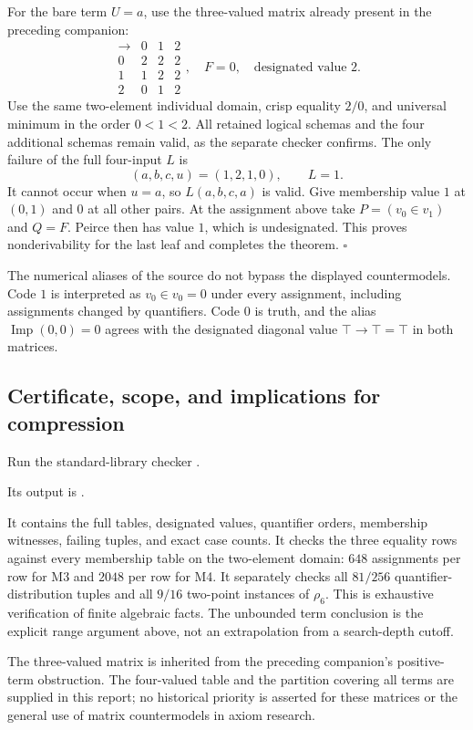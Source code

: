For the bare term $U=a$, use the three-valued matrix already present
in the preceding companion:
\[
\begin{array}{c|ccc}
 \to&0&1&2\\\hline
 0&2&2&2\\
 1&1&2&2\\
 2&0&1&2
\end{array},
\quad F=0,\quad\text{designated value }2.
\tag{M3}\label{eq:fourth-m3}
\]
Use the same two-element individual domain, crisp equality $2/0$,
and universal minimum in the order $0<1<2$.  All retained logical
schemas and the four additional schemas remain valid, as the separate
checker confirms.  The only failure of the full four-input $L$ is
\[
 (a,b,c,u)=(1,2,1,0),\qquad L=1.
\]
It cannot occur when $u=a$, so $L(a,b,c,a)$ is valid.
Give membership value $1$ at $(0,1)$ and $0$ at all other pairs.
At the assignment above take $P=(v_0\in v_1)$ and $Q=F$.
Peirce then has value $1$, which is undesignated.  This proves
nonderivability for the last leaf and completes the theorem.
\hfill$\square$

The numerical aliases of the source do not bypass the displayed
countermodels.  Code $1$ is interpreted as $v_0\in v_0=0$ under every
assignment, including assignments changed by quantifiers.  Code $0$
is truth, and the alias $\operatorname{Imp}(0,0)=0$ agrees with the
designated diagonal value $\top\to\top=\top$ in both matrices.

\subsection{Certificate, scope, and implications for compression}

Run the standard-library checker .

Its output is .

It contains the full tables, designated values, quantifier orders,
membership witnesses, failing tuples, and exact case counts.  It checks
the three equality rows against every membership table on the
two-element domain: $648$ assignments per row for M3 and $2048$ per
row for M4.  It separately checks all $81/256$ quantifier-distribution
tuples and all $9/16$ two-point instances of $\rho_6$.
This is exhaustive verification of finite algebraic facts.  The
unbounded term conclusion is the explicit range argument above,
not an extrapolation from a search-depth cutoff.

The three-valued matrix is inherited from the preceding companion's
positive-term obstruction.  The four-valued table and the partition
covering all terms are supplied in this report; no historical priority
is asserted for these matrices or the general use of matrix
countermodels in axiom research.

